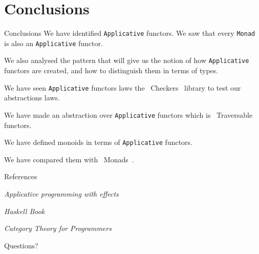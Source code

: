 \documentclass[10pt]{beamer}
\begin{document}
\section{Conclusions}

\begin{frame}{Conclusions}
  We have identified \verb~Applicative~ functors. We saw that every
  \verb~Monad~ is also an \verb~Applicative~ functor.

  We also analysed the pattern that will give us the notion of how
  \verb~Applicative~ functors are created, and how to distinguish them
  in terms of types.

  We have seen \verb~Applicative~ functors laws the ~Checkers~ library
  to test our abstractions laws.

  We have made an abstraction over \verb~Applicative~ functors which
  is ~Traversable~ functors.

  We have defined monoids in terms of \verb~Applicative~ functors.

  We have compared them with ~Monads~.
\end{frame}

\appendix

\begin{frame}{References}

  \textit{Applicative programming with effects}
  \href{http://www.staff.city.ac.uk/~ross/papers/Applicative.html}{}

  \textit{Haskell Book}
  \href{http://haskellbook.com/}{}

  \textit{Category Theory for Programmers}
  \href{https://bartoszmilewski.com/2014/10/28/category-theory-for-programmers-the-preface/}{} %

\end{frame}

\begin{frame}[standout]
  Questions?
\end{frame}
\end{document}
